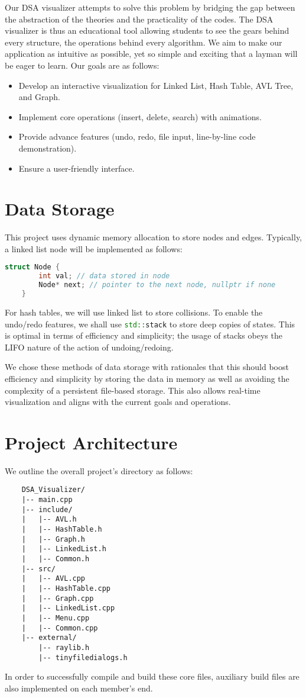 \documentclass{article}
\begin{document}
Our DSA visualizer attempts to solve this problem by bridging the gap between the abstraction of the theories and the practicality of the codes. The DSA visualizer is thus an educational tool allowing students to see the gears behind every structure, the operations behind every algorithm. We aim to make our application as intuitive as possible, yet so simple and exciting that a layman will be eager to learn. Our goals are as follows:
\begin{itemize}
	\item Develop an interactive visualization for Linked List, Hash Table, AVL Tree, and Graph.
	\item Implement core operations (insert, delete, search) with animations.
	\item Provide advance features (undo, redo, file input, line-by-line code demonstration).
	\item Ensure a user-friendly interface.
\end{itemize}

\section{Data Storage}
This project uses dynamic memory allocation to store nodes and edges. Typically, a linked list node will be implemented as follows:
\begin{lstlisting}[language=c++]
	struct Node {
		int val; // data stored in node
		Node* next; // pointer to the next node, nullptr if none
	}
\end{lstlisting}
For hash tables, we will use linked list to store collisions. To enable the undo/redo features, we shall use \lstinline[language=c++]|std::stack| to store deep copies of states. This is optimal in terms of efficiency and simplicity; the usage of stacks obeys the LIFO nature of the action of undoing/redoing.

We chose these methods of data storage with rationales that this should boost efficiency and simplicity by storing the data in memory as well as avoiding the complexity of a persistent file-based storage. This also allows real-time visualization and aligns with the current goals and operations.

\section{Project Architecture}
We outline the overall project's directory as follows:
\begin{lstlisting}
	DSA_Visualizer/
	|-- main.cpp
	|-- include/
	|   |-- AVL.h
	|   |-- HashTable.h
	|   |-- Graph.h
	|   |-- LinkedList.h
	|   |-- Common.h
	|-- src/
	|   |-- AVL.cpp
	|   |-- HashTable.cpp
	|   |-- Graph.cpp
	|   |-- LinkedList.cpp
	|   |-- Menu.cpp
	|   |-- Common.cpp
	|-- external/
		|-- raylib.h
		|-- tinyfiledialogs.h
\end{lstlisting}
In order to successfully compile and build these core files, auxiliary build files are also implemented on each member's end.
\end{document}
